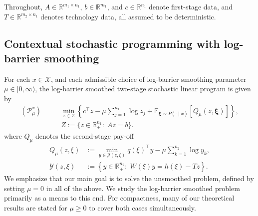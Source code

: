 \documentclass{article}
\newcommand{\R}{\mathbb{R}}
\newcommand{\E}{\mathbb{E}}
\newcommand{\1}{\mathbf{1}}
\theoremstyle{plain}
\theoremstyle{definition}
\theoremstyle{remark}
\begin{document}
Throughout, $A\in\R^{m_1\times n_1}$, $b\in\R^{m_1}$, and $c\in\R^{n_1}$ denote first-stage data, and $T\in\R^{m_2\times n_1}$ denotes technology data, all assumed to be deterministic.

\subsection{Contextual stochastic programming with log-barrier smoothing}
\label{sec:contextual-logbarrier}

For each $x\in \mathcal X$, and each admissible choice of log-barrier smoothing parameter $\mu \in [0,\infty)$, the log-barrier smoothed two-stage stochastic linear program is given by
\begin{equation}
\label{eq:Pmu-x}
\begin{aligned}
(\mathcal{P}_\mu^{x})\qquad
&\min_{z\in Z}
\left\{
c^\top z-\mu\sum_{j=1}^{n_1}\log z_j
+
\E_{\boldsymbol{\xi}\sim P(\cdot\mid x)}\!\left[Q_\mu(z,\boldsymbol{\xi})\right]
\right\},
\\
&Z:=\{z\in\R^{n_1}_+:\;Az=b\}.
\end{aligned}
\end{equation}
where $Q_\mu$ denotes the second-stage pay-off
\begin{equation}
\label{eq:Qmu}
\begin{aligned}
Q_\mu(z,\xi)
&:=
\min_{y\in\mathcal Y(z,\xi)}
q(\xi)^\top y-\mu\sum_{k=1}^{n_2}\log y_k,
\\
\mathcal Y(z,\xi)
&:=
\left\{
y\in\R^{n_2}_+:\; W(\xi)y=h(\xi)-Tz
\right\}.
\end{aligned}
\end{equation}
We emphasize that our main goal is to solve the unsmoothed problem, defined by setting $\mu = 0$ in all of the above. We study the log-barrier smoothed problem primarily as a means to this end. For compactness, many of our theoretical results are stated for $\mu\geq 0$ to cover both cases simultaneously.
\end{document}
